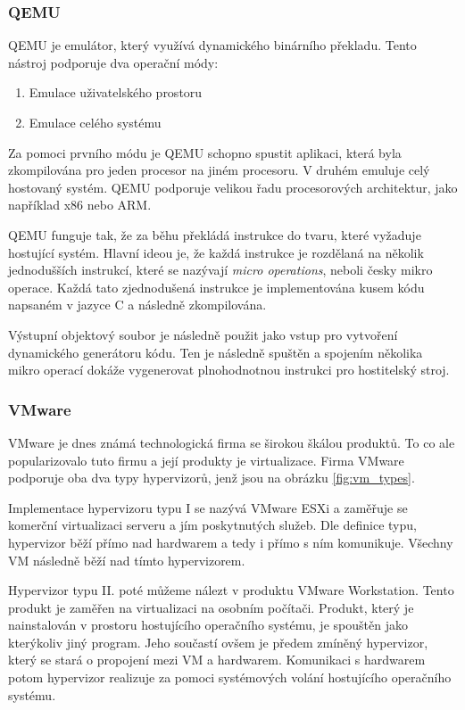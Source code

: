 \subsubsection{QEMU}
QEMU je emulátor, který využívá dynamického binárního překladu. Tento nástroj podporuje dva operační módy:

\begin{enumerate}
    \item Emulace uživatelského prostoru
    \item Emulace celého systému
\end{enumerate}

Za pomoci prvního módu je QEMU schopno spustit aplikaci, která byla zkompilována pro jeden procesor na jiném procesoru. V druhém emuluje celý hostovaný systém. QEMU podporuje velikou řadu procesorových architektur, jako například x86 nebo ARM. 

QEMU funguje tak, že za běhu překládá instrukce do tvaru, které vyžaduje hostující systém. Hlavní ideou je, že každá instrukce je rozdělaná na několik jednodušších instrukcí, které se nazývají \textit{micro operations}, neboli česky mikro operace. Každá tato zjednodušená instrukce je implementována kusem kódu napsaném v jazyce C a následně zkompilována. 

Výstupní objektový soubor je následně použit jako vstup pro vytvoření dynamického generátoru kódu. Ten je následně spuštěn a spojením několika mikro operací dokáže vygenerovat plnohodnotnou instrukci pro hostitelský stroj.\cite{chiueh2005survey}\cite{bellard2005qemu}


\subsubsection{VMware}

VMware je dnes známá technologická firma se širokou škálou produktů. To co ale popularizovalo tuto firmu a její produkty je virtualizace. Firma VMware podporuje oba dva typy hypervizorů, jenž jsou na obrázku \ref{fig:vm_types}. 

Implementace hypervizoru typu I se nazývá VMware ESXi a zaměřuje se komerční virtualizaci serveru a jím poskytnutých služeb. Dle definice typu, hypervizor běží přímo nad hardwarem a tedy i přímo s ním komunikuje. Všechny VM následně běží nad tímto hypervizorem. \cite{gillis_2022}

Hypervizor typu II. poté můžeme nálezt v produktu VMware Workstation. Tento produkt je zaměřen na virtualizaci na osobním počítači. Produkt, který je nainstalován v prostoru hostujícího operačního systému, je spouštěn jako kterýkoliv jiný program. Jeho součastí ovšem je předem zmíněný hypervizor, který se stará o propojení mezi VM a hardwarem. Komunikaci s hardwarem potom hypervizor realizuje za pomoci systémových volání hostujícího operačního systému. \cite{9647226}

